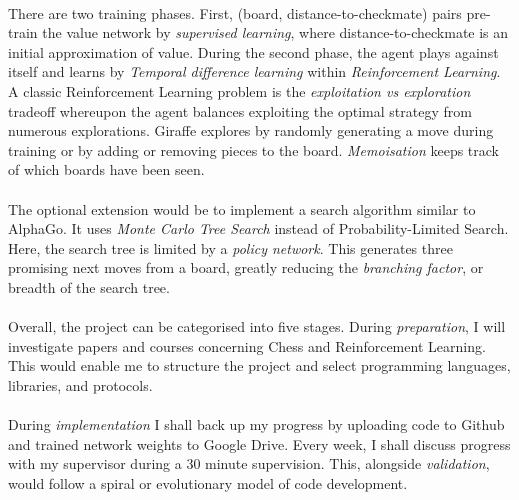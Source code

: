 \documentclass[a4paper]{article}
\begin{document}
\paragraph{} There are two training phases. First, (board, distance-to-checkmate) pairs pre-train the value network by \textit{supervised learning}, where distance-to-checkmate is an initial approximation of value. During the second phase, the agent plays against itself and learns by \textit{Temporal difference learning} within \textit{Reinforcement Learning}. A classic Reinforcement Learning problem is the \textit{exploitation vs exploration} tradeoff whereupon the agent balances exploiting the optimal strategy from numerous explorations. Giraffe explores by randomly generating a move during training or by adding or removing pieces to the board. \textit{Memoisation} keeps track of which boards have been seen. \cite{giraffe}

\paragraph{}The optional extension would be to implement a search algorithm similar to AlphaGo. It uses \textit{Monte Carlo Tree Search} instead of Probability-Limited Search. Here, the search tree is limited by a \textit{policy network}. This generates three promising next moves from a board, greatly reducing the \textit{branching factor}, or breadth of the search tree. \cite{AlphaGo}

\paragraph{}Overall, the project can be categorised into five stages. During \textit{preparation}, I will investigate papers and courses concerning Chess and Reinforcement Learning. \cite{giraffe} \cite{AlphaGo} \cite{TD-Gammon} \cite{knightcap} This would enable me to structure the project and select programming languages, libraries, and protocols.

\paragraph{}During \textit{implementation} I shall back up my progress by uploading code to Github and trained network weights to Google Drive. Every week, I shall discuss progress with my supervisor during a 30 minute supervision. This, alongside \textit{validation}, would follow a spiral or evolutionary model of code development.
\end{document}
